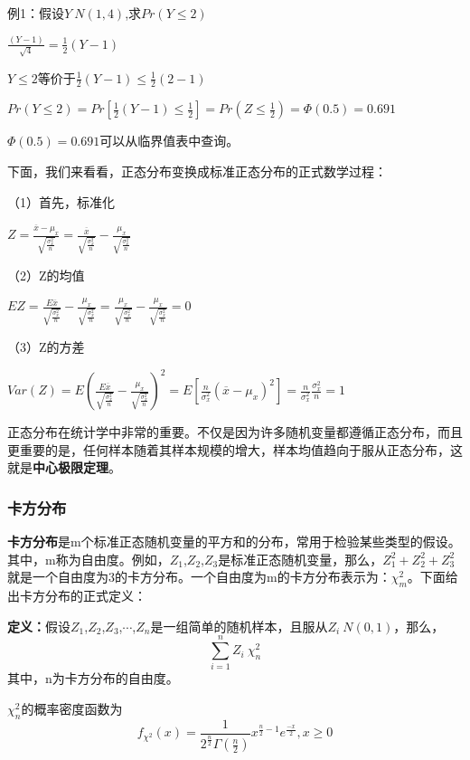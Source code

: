 \documentclass[cn,10pt,math=newtx,citestyle=gb7714-2015,bibstyle=gb7714-2015]{elegantbook}
\begin{document}
	例1：假设$Y~N(1,4)$,求$Pr(Y\le2)$
	
	$\frac{(Y-1)}{\sqrt{4}}=\frac{1}{2}(Y-1)$
	
	$Y\le2$等价于$\frac{1}{2}(Y-1)\le{\frac{1}{2}(2-1)}$
	
	$Pr(Y\le2)=Pr[\frac{1}{2}(Y-1)\le{\frac{1}{2}}]=Pr(Z\le{\frac{1}{2}})=\Phi(0.5)=0.691$
	
	$\Phi(0.5)=0.691$可以从临界值表中查询。
	
	下面，我们来看看，正态分布变换成标准正态分布的正式数学过程：
	
	（1）首先，标准化
	
	$Z=\frac{\overline{x}-\mu_x}{\sqrt{\frac{\sigma_x^2}{n}}}=\frac{\overline{x}}{\sqrt{\frac{\sigma_x^2}{n}}}-\frac{\mu_x}{\sqrt{\frac{\sigma_x^2}{n}}}$
	
	
	
	（2）Z的均值
	
	$EZ=\frac{E\overline{x}}{\sqrt{\frac{\sigma_{x}^{2}}{n}}}-\frac{\mu_x}{\sqrt{\frac{\sigma_{x}^{2}}{n}}}=\frac{\mu_x}{\sqrt{\frac{\sigma_{x}^{2}}{n}}}-\frac{\mu_x}{\sqrt{\frac{\sigma_{x}^{2}}{n}}}=0$
	
	
	
	（3）Z的方差
	
	$Var(Z)=E(\frac{E\overline{x}}{\sqrt{\frac{\sigma_{x}^{2}}{n}}}-\frac{\mu_x}{\sqrt{\frac{\sigma_{x}^{2}}{n}}})^2=E[\frac{n}{\sigma_x^2}(\overline{x}-\mu_x)^2]=\frac{n}{\sigma_x^2}\frac{\sigma_x^2}{n}=1$
	
	正态分布在统计学中非常的重要。不仅是因为许多随机变量都遵循正态分布，而且更重要的是，任何样本随着其样本规模的增大，样本均值趋向于服从正态分布，这就是\textbf{中心极限定理}。
	
	\subsubsection{卡方分布}
	\textbf{卡方分布}是m个标准正态随机变量的平方和的分布，常用于检验某些类型的假设。其中，m称为自由度。例如，$Z_1$,$Z_2$,$Z_3$是标准正态随机变量，那么，$Z_1^2+Z_2^2+Z_3^2$就是一个自由度为3的卡方分布。一个自由度为m的卡方分布表示为：$\chi_m^2$。下面给出卡方分布的正式定义：
	
	\textbf{定义：}假设$Z_1$,$Z_2$,$Z_3$,$\cdots$,$Z_n$是一组简单的随机样本，且服从$Z_i~N(0,1)$，那么，
	\begin{equation}
		\sum_{i=1}^n{Z_i}~\chi_n^2
	\end{equation}
	其中，n为卡方分布的自由度。
	
	$\chi_n^2$的概率密度函数为
	\begin{equation}
		f_{\chi^2}(x)=\frac{1}{2^{\frac{n}{2}}\Gamma(\frac{n}{2})}x^{\frac{n}{2}-1}e^{\frac{-x}{2}},x\geq0
	\end{equation}
	
\end{document}
